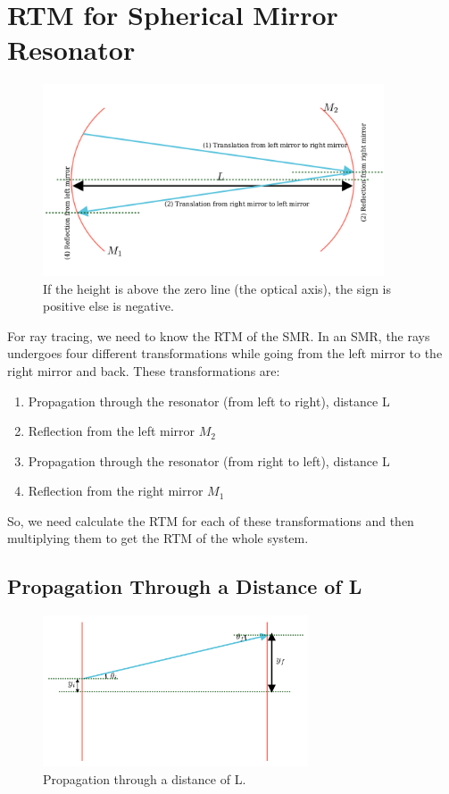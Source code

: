 \documentclass[12pt]{article}
\begin{document}
\section{RTM for Spherical Mirror Resonator}
\begin{figure}[h]
    \centering
    \includegraphics[width=0.9\textwidth]{images/round_trip.png}
    \caption{If the height is above the zero line (the optical axis), the sign is positive else is negative.}
    \label{fig:round-trip}
\end{figure}

For ray tracing, we need to know the RTM of the SMR. In an SMR, the rays undergoes four different transformations while going from the left mirror to the right mirror and back. These transformations are:
\begin{enumerate}
    \item Propagation through the resonator (from left to right), distance L
    \item Reflection from the left mirror \(M_2\)
    \item Propagation through the resonator (from right to left), distance L
    \item Reflection from the right mirror \(M_1\)
\end{enumerate}

So, we need calculate the RTM for each of these transformations and then multiplying them to get the RTM of the whole system.

\subsection{Propagation Through a Distance of L}
\begin{figure}[h]
    \centering
    \includegraphics[width=0.7\textwidth]{images/translation.png}
    \caption{Propagation through a distance of L.}
    \label{fig:translation}
\end{figure}
\end{document}
